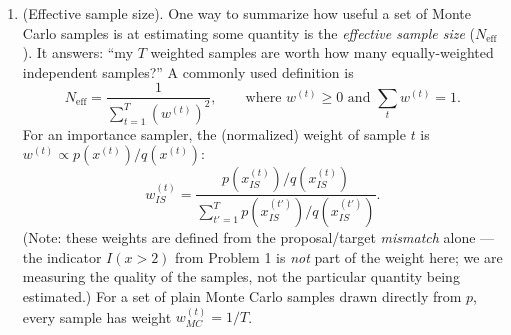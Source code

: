 \documentclass[11pt]{article}
\begin{document}
\begin{enumerate}
\begin{enumerate}
\item {\bf Tune the step sizes.} Report the {\em acceptance rate} (fraction of MH proposals accepted) for each bag set, and tune the step sizes $s_\varphi$ and $s_\ell$ so that the acceptance rate lands in roughly the $0.2$--$0.5$ range for {\em each} set. You will likely find that the two bag sets need {\em different} step sizes. In 2--3 sentences, explain (i) what happens to the acceptance rate when a step size is too small versus too large, and (ii) why the two bag sets favor different step sizes (hint: think about how concentrated the posterior over $\kappa$ is in each case --- one bag set pins $\kappa$ down much more tightly than the other --- and connect it to the mixing discussion from lecture).

\item {\bf Write up your results.} In one paragraph, describe the histograms for $\kappa$ and $\varphi$ given each set of marble bags and explain what their values mean. In a second paragraph, compare the two bag sets: what is similar and what is different in $\bar\kappa$, $\bar\varphi$, and the predictive value, and why?

\end{enumerate}

\item (Effective sample size). One way to summarize how useful a set of Monte Carlo samples is at estimating some quantity is the {\em effective sample size} ($N_{\mathrm{eff}}$). It answers: ``my $T$ weighted samples are worth how many equally-weighted independent samples?'' A commonly used definition is
\begin{equation}\label{eq:ess}
N_{\mathrm{eff}} = \frac{1}{\sum_{t=1}^T \left(w^{(t)}\right)^2}, \qquad \text{where } w^{(t)} \ge 0 \text{ and } \sum_t w^{(t)} = 1.
\end{equation}
For an importance sampler, the (normalized) weight of sample $t$ is $w^{(t)} \propto p(x^{(t)})/q(x^{(t)})$:
\begin{equation*}
w_{IS}^{(t)} = \frac{p(x_{IS}^{(t)})/q(x_{IS}^{(t)})}{\sum_{t'=1}^T p(x_{IS}^{(t')})/q(x_{IS}^{(t')})}.
\end{equation*}
(Note: these weights are defined from the proposal/target {\em mismatch} alone --- the indicator $I(x>2)$ from Problem 1 is {\em not} part of the weight here; we are measuring the quality of the samples, not the particular quantity being estimated.) For a set of plain Monte Carlo samples drawn directly from $p$, every sample has weight $w_{MC}^{(t)} = 1/T$.


\end{enumerate}
\end{document}
